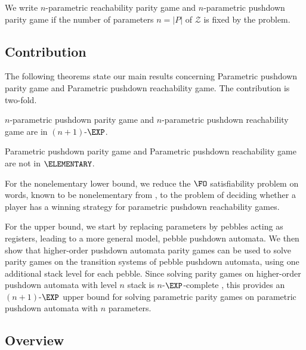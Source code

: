 We write {\sc $n$-parametric reachability parity game}
and
{\sc $n$-parametric pushdown parity game} if 
 the number of parameters $n=|P|$ of $\mathcal{Z}$ is fixed by the problem.


\subsection{Contribution}\label{contribution ppda}



The following theorems state our main results concerning {\sc Parametric pushdown parity game}
and {\sc Parametric pushdown reachability game}. The contribution is two-fold. 

\begin{theorem}
{\sc $n$-parametric pushdown parity game} and {\sc $n$-parametric pushdown reachability game} are in $(n+1)$-$\EXP$.
\end{theorem}

\begin{theorem}
{\sc Parametric pushdown parity game} and {\sc Parametric pushdown reachability game} are not in $\ELEMENTARY$.
\end{theorem}


	For the nonelementary lower bound,
we reduce the $\FO$ satisfiability problem on words, known to be nonelementary
from \cite{Sto74}, to the
problem of deciding whether a player has a winning strategy for parametric pushdown reachability games. 

	For the upper bound, we start by replacing parameters by pebbles acting as registers, leading to a more general model, pebble pushdown automata.
 We then show that higher-order pushdown automata parity games can be used to solve parity games on
 the transition systems of pebble pushdown automata,
using one additional stack level for each pebble.
 Since solving parity games on higher-order pushdown automata with level $n$ stack is $n$-$\EXP$-complete \cite{ Cach03, cachat2007complexity}, this provides an $(n+1)$-$\EXP$ upper bound for solving parametric parity games on parametric pushdown automata with $n$ parameters.

\subsection{Overview}

